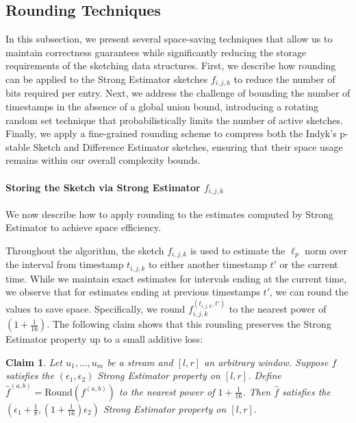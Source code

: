 \documentclass{article}
\newcommand{\est}{\textsf{Strong Estimator }}
\newcommand{\ind}{\textsf{Indyk's p-stable Sketch }}
\newcommand{\dif}{\textsf{Difference Estimator }}
\theoremstyle{plain}
\newtheorem{clm}[theorem]{Claim}
\begin{document}
    








%
 \subsection{Rounding Techniques}
In this subsection, we present several space-saving techniques that allow us to maintain correctness guarantees while significantly reducing the storage requirements of the sketching data structures. First, we describe how rounding can be applied to the \est sketches $f_{i,j,k}$ to reduce the number of bits required per entry. Next, we address the challenge of bounding the number of timestamps in the absence of a global union bound, introducing a rotating random set technique that probabilistically limits the number of active sketches. Finally, we apply a fine-grained rounding scheme to compress both the \ind and \dif sketches, ensuring that their space usage remains within our overall complexity bounds.

\paragraph{Storing the Sketch via \est $f_{i, j, k}$}

We now describe how to apply rounding to the estimates computed by \est to achieve space efficiency.

Throughout the algorithm, the sketch $f_{i,j,k}$ is used to estimate the $\ell_p$ norm over the interval from timestamp $t_{i,j,k}$ to either another timestamp $t'$ or the current time. While we maintain exact estimates for intervals ending at the current time, we observe that for estimates ending at previous timestamps $t'$, we can round the values to save space. Specifically, we round $f_{i,j,k}^{(t_{i,j,k}, t')}$ to the nearest power of $(1 + \frac{1}{16})$. The following claim shows that this rounding preserves the \est property up to a small additive loss:

\begin{clm} Let $u_1, \dots, u_m$ be a stream and $[l, r]$ an arbitrary window. Suppose $f$ satisfies the $(\epsilon_1, \epsilon_2)$ \est property on $[l, r]$. Define $\hat{f}^{(a,b)} = \text{Round}(f^{(a,b)})$ to the nearest power of $1 + \frac{1}{16}$. Then $\hat{f}$ satisfies the $(\epsilon_1 + \frac{1}{8}, (1+\frac{1}{16}) \epsilon_2)$ \est property on $[l, r]$. \end{clm}
\end{document}
